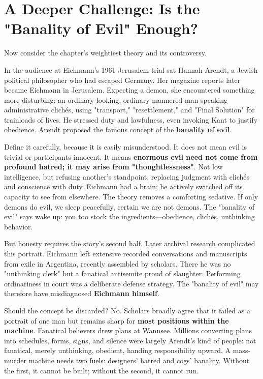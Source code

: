 \section[Is the Banality of Evil Enough?]{A Deeper Challenge: Is the "Banality of Evil" Enough?}
Now consider the chapter's weightiest theory and its controversy.

In the audience at Eichmann's 1961 Jerusalem trial sat Hannah Arendt, a Jewish political philosopher who had escaped Germany. Her magazine reports later became Eichmann in Jerusalem. Expecting a demon, she encountered something more disturbing: an ordinary-looking, ordinary-mannered man speaking administrative clichés, using "transport," "resettlement," and "Final Solution" for trainloads of lives. He stressed duty and lawfulness, even invoking Kant to justify obedience. Arendt proposed the famous concept of the \textbf{banality of evil}.

Define it carefully, because it is easily misunderstood. It does not mean evil is trivial or participants innocent. It means \textbf{enormous evil need not come from profound hatred; it may arise from "thoughtlessness"}. Not low intelligence, but refusing another's standpoint, replacing judgment with clichés and conscience with duty. Eichmann had a brain; he actively switched off its capacity to see from elsewhere. The theory removes a comforting sedative. If only demons do evil, we sleep peacefully, certain we are not demons. The "banality of evil" says wake up: you too stock the ingredients---obedience, clichés, unthinking behavior.

But honesty requires the story's second half. Later archival research complicated this portrait. Eichmann left extensive recorded conversations and manuscripts from exile in Argentina, recently assembled by scholars. There he was no "unthinking clerk" but a fanatical antisemite proud of slaughter. Performing ordinariness in court was a deliberate defense strategy. The "banality of evil" may therefore have misdiagnosed \textbf{Eichmann himself}.

Should the concept be discarded? No. Scholars broadly agree that it failed as a portrait of one man but remains sharp for \textbf{most positions within the machine}. Fanatical believers drew plans at Wannsee. Millions converting plans into schedules, forms, signs, and silence were largely Arendt's kind of people: not fanatical, merely unthinking, obedient, handing responsibility upward. A mass-murder machine needs two fuels: designers' hatred and cogs' banality. Without the first, it cannot be built; without the second, it cannot run.

